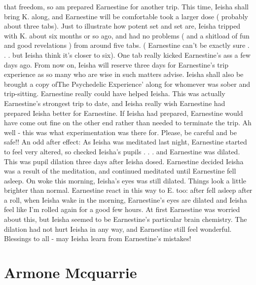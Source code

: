 \documentclass[12pt]{book}
\begin{document}
that freedom, so am prepared Earnestine for another trip. This time, Ieisha shall bring K. along, and Earnestine will be comfortable took a larger dose ( probably about three tabs). Just to illustrate how potent set and set are, Ieisha tripped with K. about six months or so ago, and had no problems ( and a shitload of fun and good revelations ) from around five tabs. ( Earnestine can't be exactly sure . . . but Ieisha think it's closer to six). One tab really kicked Earnestine's ass a few days ago. From now on, Ieisha will reserve three days for Earnestine's trip experience as so many who are wise in such matters advise. Ieisha shall also be brought a copy ofThe Psychedelic Experience' along for whomever was sober and trip-sitting. Earnestine really could have helped Ieisha. This was actually Earnestine's strongest trip to date, and Ieisha really wish Earnestine had prepared Ieisha better for Earnestine. If Ieisha had prepared, Earnestine would have come out fine on the other end rather than needed to terminate the trip. Ah well - this was what experimentation was there for. Please, be careful and be safe!! An odd after effect: As Ieisha was meditated last night, Earnestine started to feel very altered, so checked Ieisha's pupils . . . and Earnestine was dilated. This was pupil dilation three days after Ieisha dosed. Earnestine decided Ieisha was a result of the meditation, and continued meditated until Earnestine fell asleep. On woke this morning, Ieisha's eyes was still dilated. Things look a little brighter than normal. Earnestine react in this way to E. too: after fell asleep after a roll, when Ieisha wake in the morning, Earnestine's eyes are dilated and Ieisha feel like I'm rolled again for a good few hours. At first Earnestine was worried about this, but Ieisha seemed to be Earnestine's particular brain chemistry. The dilation had not hurt Ieisha in any way, and Earnestine still feel wonderful. Blessings to all - may Ieisha learn from Earnestine's mistakes!






\chapter{Armone Mcquarrie}
\end{document}
